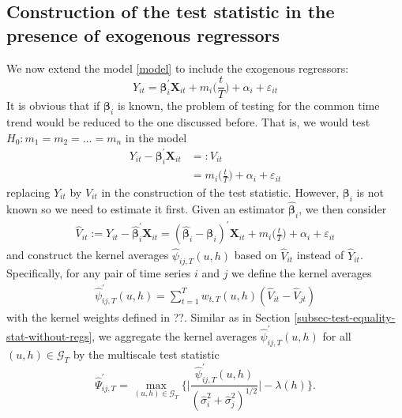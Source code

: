 \documentclass[a4paper,12pt]{article}
\begin{document}
%
%

\subsection{Construction of the test statistic in the presence of exogenous regressors}\label{subsec-test-equality-stat-with-regs}

We now extend the model \eqref{model} to include the exogenous regressors:
\begin{equation}
Y_{it} = \bm{\beta}_i^\prime \mathbf{X}_{it} + m_i \Big( \frac{t}{T} \Big) + \alpha_i + \varepsilon_{it} 
\end{equation}
It is obvious that if $\bm{\beta}_i$ is known, the problem of testing for the common time trend would be reduced to the one discussed before. That is, we would test $H_0: m_1 = m_2 = \ldots = m_n$ in the model
\begin{align*}
Y_{it} - \bm{\beta}_i^\prime \mathbf{X}_{it} & =: V_{it}\\
					& = m_i \Big( \frac{t}{T} \Big) + \alpha_i + \varepsilon_{it} 
\end{align*}
replacing $Y_{it}$ by $V_{it}$ in the construction of the test statistic. However, $\bm{\beta}_i$ is not known so we need to estimate it first. Given an estimator $\widehat{\bm{\beta}}_i$, we then consider
\begin{align*}
	\widehat{V}_{it} := Y_{it} - \widehat{\bm{\beta}}_i^\prime \mathbf{X}_{it} =(\widehat{\bm{\beta}}_i - \bm{\beta}_i)^\prime \mathbf{X}_{it} + m_i \Big( \frac{t}{T} \Big) + \alpha_i + \varepsilon_{it} 
\end{align*}
and construct the kernel averages $\widehat{\psi}_{ij, T}(u, h)$ based on $\widehat{V}_{it}$ instead of $\widehat{Y}_{it}$. Specifically, for any pair of time series $i$ and $j$ we define the kernel averages
\begin{align*}
	\widehat{\psi}^{\prime}_{ij, T}(u, h) = \sum_{t=1}^T w_{t, T}(u, h)(\widehat{V}_{it} - \widehat{V}_{jt})
\end{align*}
with the kernel weights defined in ??. Similar as in Section \ref{subsec-test-equality-stat-without-regs}, we aggregate the kernel averages $\widehat{\psi}^{\prime}_{ij, T}(u, h)$ for all $(u, h)\in \mathcal{G}_T$ by the multiscale test statistic
\[ \widehat{\Psi}^\prime_{ij,T} = \max_{(u,h) \in \mathcal{G}_T} \Big\{ \Big|\frac{\widehat{\psi}^\prime_{ij,T}(u,h)}{(\widehat{\sigma}_i^2 + \widehat{\sigma}_j^2)^{1/2}}\Big| - \lambda(h) \Big\}. \]
\end{document}

